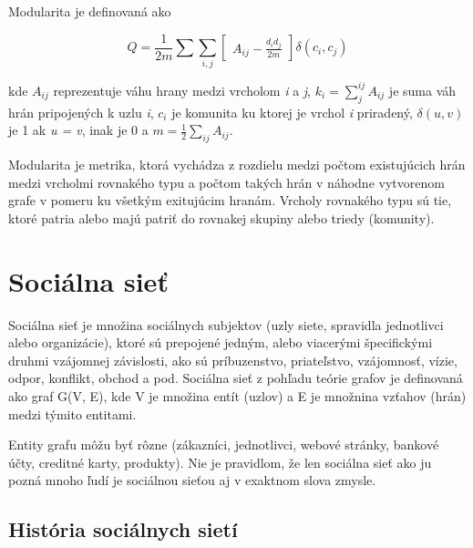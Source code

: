 \documentclass[slovak,master,public,dept460,male,cpdeclaration,oneside]{diploma}
\begin{document}
\begin{definition}
Modularita je definovaná ako 


\begin{equation}    
{
Q = \frac{1}{2m}\sum \sum_{i,j}\begin{bmatrix}
A_{ij} - \frac{d_{i}d_{j}}{2m}
\end{bmatrix} \delta (c_{i}, c_{j})
} 
\label{equation_modularita}
\end{equation}
\end{definition}

kde ${}A_{ij}$ reprezentuje váhu hrany medzi vrcholom \textit{i} a \textit{j}, ${k_{i} = \sum_{j}^{ij}A_{ij}}$ je suma váh hrán pripojených k uzlu \textit{i}, ${}c_{i}$ je komunita ku ktorej je vrchol \textit{i} priradený, ${} \delta(u,v)$ je 1 ak \textit{u = v}, inak je 0 a ${m = \frac{1}{2}\sum_{ij}A_{ij}}$. \cite{blondel2008fast}



Modularita je metrika, ktorá vychádza z rozdielu medzi počtom existujúcich hrán medzi vrcholmi rovnakého typu a počtom takých hrán v náhodne vytvorenom grafe v pomeru ku všetkým exitujúcim hranám. Vrcholy rovnakého typu sú tie, ktoré patria alebo majú patriť do rovnakej skupiny alebo triedy (komunity).







\section{Sociálna sieť}

Sociálna sieť je množina sociálnych subjektov (uzly siete, spravidla jednotlivci alebo organizácie),
ktoré sú prepojené jedným, alebo viacerými špecifickými druhmi vzájomnej závislosti, ako sú príbuzenstvo, priateľstvo, vzájomnosť, vízie, odpor, konflikt, obchod a pod.
Sociálna sieť z pohľadu teórie grafov je definovaná ako graf G(V, E), kde V je množina entít
(uzlov) a E je množnina vzťahov (hrán) medzi týmito entitami.

Entity grafu môžu byť rôzne (zákazníci, jednotlivci, webové stránky, bankové účty, creditné karty, produkty). Nie je pravidlom, že len sociálna sieť ako ju pozná mnoho ľudí je sociálnou sieťou aj v exaktnom slova zmysle. 

\subsection{História sociálnych sietí}
\end{document}
